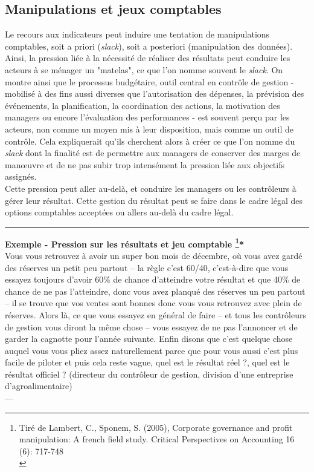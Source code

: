 \documentclass{kaobook}
\begin{document}
\subsection{Manipulations et jeux comptables}
\label{sec:org6d0f58d}
Le recours aux indicateurs peut induire une tentation de manipulations comptables, soit a priori (\emph{slack}), soit a posteriori (manipulation des données).\\

Ainsi, la pression liée à la nécessité de réaliser des résultats peut conduire les acteurs à se ménager un "matelas", ce que l’on nomme souvent le \emph{slack}. On montre ainsi que le processus budgétaire, outil central en contrôle de gestion - mobilisé à des fins aussi diverses que l’autorisation des dépenses, la prévision des événements, la planification, la coordination des actions, la motivation des managers ou encore l’évaluation des performances - est souvent perçu par les acteurs, non comme un moyen mis à leur disposition, mais comme un outil de contrôle. Cela expliquerait qu’ils cherchent alors à créer ce que l’on nomme du \emph{slack} dont la finalité est de permettre aux managers de conserver des marges de manœuvre et de ne pas subir trop intensément la pression liée aux objectifs assignés.\\

Cette pression peut aller au-delà, et conduire les managers ou les contrôleurs à gérer leur résultat. Cette gestion du résultat peut se faire dans le cadre légal des options comptables acceptées ou allers au-delà du cadre légal.\\

\noindent\rule{\textwidth}{0.5pt}
\textbf{Exemple - Pression sur les résultats et jeu comptable \footnote{Tiré de Lambert, C., Sponem, S. (2005), Corporate governance and profit manipulation: A french field study. Critical Perspectives on Accounting 16 (6): 717-748\\}*}\\
Vous vous retrouvez à avoir un super bon mois de décembre, où vous  avez gardé des réserves un petit peu partout – la règle c’est 60/40, c’est-à-dire que vous essayez toujours d’avoir 60\% de chance d’atteindre votre résultat et que 40\% de chance de ne pas l’atteindre, donc vous avez planqué des réserves un peu partout – il se trouve que vos ventes sont bonnes donc vous vous retrouvez avec plein de réserves. Alors là, ce que vous essayez en général de faire – et tous les contrôleurs de gestion vous diront la même chose – vous essayez de ne pas l’annoncer et de garder la cagnotte pour l’année suivante. Enfin disons que c’est quelque chose auquel vous vous pliez assez naturellement parce que pour vous aussi c’est plus facile de piloter et puis cela reste vague, quel est le résultat réel ?, quel est le résultat officiel ? (directeur du contrôleur de gestion, division d’une entreprise d’agroalimentaire)\\
---\\
\end{document}
